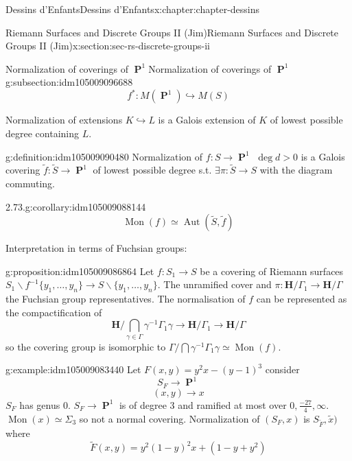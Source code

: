 \documentclass[oneside,10pt,]{book}
\numberwithin{equation}{section}
\newcommand{\inv}{^{-1}}
\newcommand{\HH}{\mathbf{H}}
\DeclareMathOperator{\PP}{\mathbf{P}}
\DeclareMathOperator{\Aut}{Aut}
\newcommand{\gt}{>}
\begin{document}
\begin{chapterptx}{Dessins d'Enfants}{}{Dessins d'Enfants}{}{}{x:chapter:chapter-dessins}
\begin{sectionptx}{Riemann Surfaces and Discrete Groups II (Jim)}{}{Riemann Surfaces and Discrete Groups II (Jim)}{}{}{x:section:sec-rs-discrete-groups-ii}
\begin{subsectionptx}{Normalization of coverings of \(\PP^1\)}{}{Normalization of coverings of \(\PP^1\)}{}{}{g:subsection:idm105009096688}
\begin{equation*}
f^* \colon M(\PP^1 ) \hookrightarrow M(S)
\end{equation*}
%
\par
Normalization of extensions \(K \hookrightarrow L\) is a Galois extension of \(K \) of lowest possible degree containing \(L\).%
\begin{definition}{}{g:definition:idm105009090480}%
Normalization of \(f\colon S\to \PP^1\) \(\deg d \gt 0 \) is a Galois covering \(\tilde f \colon \tilde S \to \PP^1 \) of  lowest possible degree s.t. \(\exists \pi \colon \tilde S \to S\) with  the diagram commuting.%
\end{definition}
\begin{corollary}{2.73.}{}{g:corollary:idm105009088144}%
%
\begin{equation*}
\operatorname{Mon}(f)  \simeq \Aut(\tilde S, \tilde f)
\end{equation*}
%
\end{corollary}
Interpretation in terms of Fuchsian groups:%
\begin{proposition}{}{}{g:proposition:idm105009086864}%
Let \(f\colon S_1 \to S\) be a covering of Riemann surfaces \(S_1\smallsetminus f\inv \{ y_1, \ldots, y_n \} \to S \smallsetminus\{ y_1, \ldots, y_n \}\). The unramified cover and \(\pi \colon \HH/ \Gamma_1 \to \HH/ \Gamma\) the Fuchsian group representatives. The normalisation of \(f\) can be represented as the compactification of%
\begin{equation*}
\HH/ \bigcap_{\gamma \in \Gamma} \gamma \inv \Gamma_1 \gamma \to \HH/\Gamma_1 \to \HH/\Gamma
\end{equation*}
so the covering group is isomorphic to \(\Gamma/ \bigcap \gamma \inv \Gamma_1 \gamma \simeq \operatorname{Mon}(f)\).%
\end{proposition}
\begin{example}{}{g:example:idm105009083440}%
Let \(F(x,y) = y^2x - (y-1)^3\) consider%
\begin{equation*}
S_F \to \PP^1
\end{equation*}
%
\begin{equation*}
(x,y) \to x
\end{equation*}
\(S_F\) has genus 0. \(S_F \to \PP^1\) is of degree 3 and ramified at most over \(0, \frac{-27}{4}, \infty\). \(\operatorname{Mon}(x)  \simeq \Sigma_3\) so not a normal covering. Normalization of \((S_F, x)\) is \(S_{\tilde F} , \tilde x)\) where%
\begin{equation*}
\tilde F (x,y) = y^2 ( 1-y)^2 x +  (1-y + y^2)

\end{equation*}
\end{example}
\end{subsectionptx}
\end{sectionptx}
\end{chapterptx}
\end{document}
